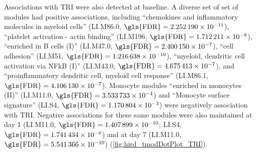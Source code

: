 Associations with \gls{TRI} were also detected at baseline.
A diverse set of set of modules had positive associations, including
\enquote{chemokines and inflammatory molecules in myeloid cells} (LI.M86.0,  $\text{\gls{FDR}} = \num{2.252190e-11}$),
\enquote{platelet activation - actin binding} (LI.M196, $\text{\gls{FDR}} = \num{1.712211e-08}$),
\enquote{enriched in B cells (I)} (LI.M47.0, $\text{\gls{FDR}} = \num{2.400150e-07}$),
\enquote{cell adhesion} (LI.M51, $\text{\gls{FDR}} = \num{1.216638e-10}$),
\enquote{myeloid, dendritic cell activation via NFkB (I)} (LI.M43.0, $\text{\gls{FDR}} = \num{4.675413e-07}$),
and \enquote{proinflammatory dendritic cell, myeloid cell response} (LI.M86.1, $\text{\gls{FDR}} = \num{4.106130e-07}$).
Monocyte modules 
\enquote{enriched in monocytes (II)} (LI.M11.0, $\text{\gls{FDR}} = \num{3.533733e-04}$) and
\enquote{Monocyte surface signature} (LI.S4, $\text{\gls{FDR}} = \num{1.170804e-03}$)
were negatively association with \gls{TRI}.
Negative associations for these same modules were also maintained at day 1 (LI.M11.0, $\text{\gls{FDR}} = \num{1.407899e-10}$;
LI.S4, $\text{\gls{FDR}} = \num{1.741434e-06}$)
and at day 7 (LI.M11.0, $\text{\gls{FDR}} = \num{5.541366e-10}$) (\cref{fig:hird_tmodDotPlot_TRI}).


